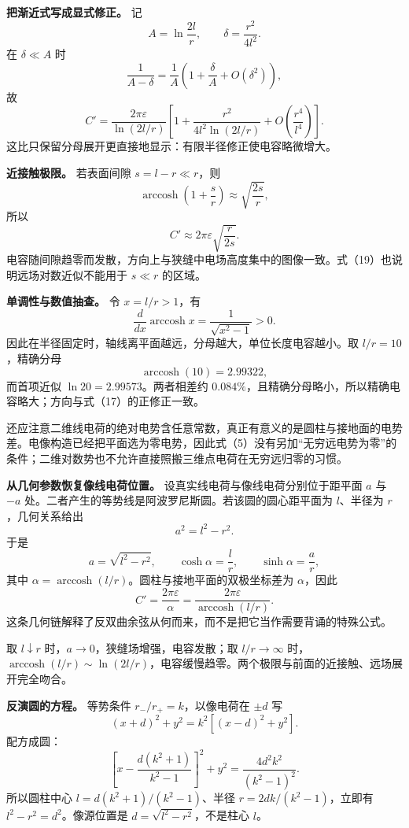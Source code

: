 \documentclass[12pt,a4paper,UTF8]{ctexart}
\begin{document}
\textbf{把渐近式写成显式修正。} 记 \[
A=\ln\frac{2l}{r},
\qquad
\delta=\frac{r^2}{4l^2}. \tag{15}
\] 在 \(\delta\ll A\) 时 \[
\frac1{A-\delta}
=\frac1A\left(1+\frac\delta A+O(\delta^2)\right), \tag{16}
\] 故 \[
C'=\frac{2\pi\varepsilon}{\ln(2l/r)}
\left[
1+\frac{r^2}{4l^2\ln(2l/r)}
+O\!\left(\frac{r^4}{l^4}\right)
\right]. \tag{17}
\] 这比只保留分母展开更直接地显示：有限半径修正使电容略微增大。

\textbf{近接触极限。} 若表面间隙 \(s=l-r\ll r\)，则 \[
\operatorname{arccosh}\left(1+\frac sr\right)
\approx\sqrt{\frac{2s}{r}}, \tag{18}
\] 所以 \[
C'\approx2\pi\varepsilon\sqrt{\frac{r}{2s}}. \tag{19}
\]
电容随间隙趋零而发散，方向上与狭缝中电场高度集中的图像一致。式（19）也说明远场对数近似不能用于
\(s\ll r\) 的区域。

\textbf{单调性与数值抽查。} 令 \(x=l/r>1\)，有 \[
\frac{d}{dx}\operatorname{arccosh}x
=\frac1{\sqrt{x^2-1}}>0. \tag{20}
\] 因此在半径固定时，轴线离平面越远，分母越大，单位长度电容越小。取
\(l/r=10\)，精确分母 \[
\operatorname{arccosh}(10)=2.99322,
\] 而首项近似 \(\ln20=2.99573\)。两者相差约
\(0.084\%\)，且精确分母略小，所以精确电容略大；方向与式（17）的正修正一致。

还应注意二维线电荷的绝对电势含任意常数，真正有意义的是圆柱与接地面的电势差。电像构造已经把平面选为零电势，因此式（5）没有另加``无穷远电势为零''的条件；二维对数势也不允许直接照搬三维点电荷在无穷远归零的习惯。

\textbf{从几何参数恢复像线电荷位置。}
设真实线电荷与像线电荷分别位于距平面 \(a\) 与 \(-a\)
处。二者产生的等势线是阿波罗尼斯圆。若该圆的圆心距平面为 \(l\)、半径为
\(r\)，几何关系给出 \[
a^2=l^2-r^2.
\] 于是 \[
a=\sqrt{l^2-r^2},\qquad
\cosh\alpha=\frac lr,\qquad
\sinh\alpha=\frac ar,
\] 其中
\(\alpha=\operatorname{arccosh}(l/r)\)。圆柱与接地平面的双极坐标差为
\(\alpha\)，因此 \[
C'=\frac{2\pi\varepsilon}{\alpha}
=\frac{2\pi\varepsilon}
{\operatorname{arccosh}(l/r)}.
\]
这条几何链解释了反双曲余弦从何而来，而不是把它当作需要背诵的特殊公式。

取 \(l\downarrow r\) 时，\(a\to0\)，狭缝场增强，电容发散；取
\(l/r\to\infty\)
时，\(\operatorname{arccosh}(l/r)\sim\ln(2l/r)\)，电容缓慢趋零。两个极限与前面的近接触、远场展开完全吻合。

\textbf{反演圆的方程。} 等势条件 \(r_-/r_+=k\)，以像电荷在 \(\pm d\) 写
\[
(x+d)^2+y^2=k^2[(x-d)^2+y^2].
\] 配方成圆： \[
\left[x-\frac{d(k^2+1)}{k^2-1}\right]^2+y^2
=\frac{4d^2k^2}{(k^2-1)^2}.
\] 所以圆柱中心 \(l=d(k^2+1)/(k^2-1)\)、半径 \(r=2dk/(k^2-1)\)，立即有
\(l^2-r^2=d^2\)。像源位置是 \(d=\sqrt{l^2-r^2}\)，不是柱心 \(l\)。
\end{document}
